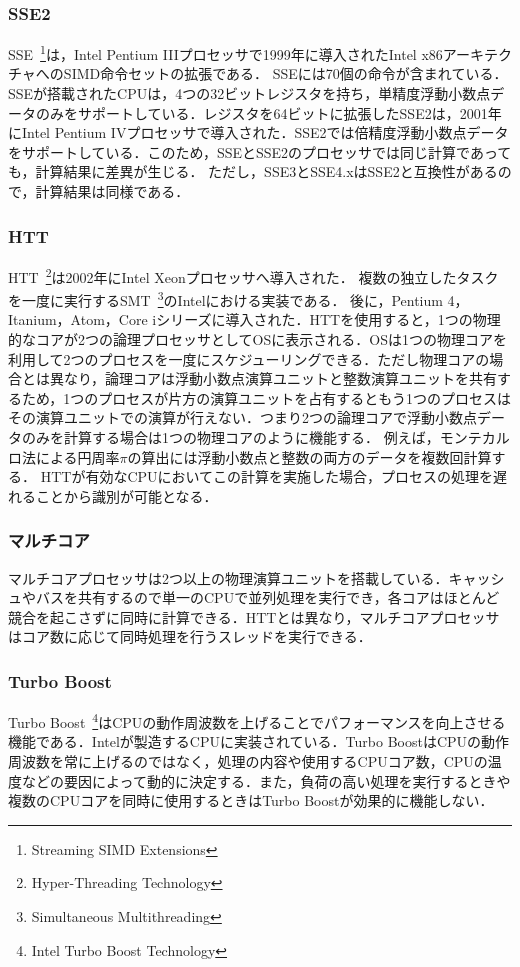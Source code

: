 \subsubsection{SSE2}
SSE~\footnote{Streaming SIMD Extensions}は，Intel Pentium IIIプロセッサで1999年に導入されたIntel x86アーキテクチャへのSIMD命令セットの拡張である． SSEには70個の命令が含まれている．SSEが搭載されたCPUは，4つの32ビットレジスタを持ち，単精度浮動小数点データのみをサポートしている．レジスタを64ビットに拡張したSSE2は，2001年にIntel Pentium IVプロセッサで導入された．SSE2では倍精度浮動小数点データをサポートしている．このため，SSEとSSE2のプロセッサでは同じ計算であっても，計算結果に差異が生じる．
ただし，SSE3とSSE4.xはSSE2と互換性があるので，計算結果は同様である．
\subsubsection{HTT}
HTT~\footnote{Hyper-Threading Technology}は2002年にIntel Xeonプロセッサへ導入された．
複数の独立したタスクを一度に実行するSMT~\footnote{Simultaneous Multithreading}のIntelにおける実装である．
後に，Pentium 4，Itanium，Atom，Core iシリーズに導入された．HTTを使用すると，1つの物理的なコアが2つの論理プロセッサとしてOSに表示される．OSは1つの物理コアを利用して2つのプロセスを一度にスケジューリングできる．ただし物理コアの場合とは異なり，論理コアは浮動小数点演算ユニットと整数演算ユニットを共有するため，1つのプロセスが片方の演算ユニットを占有するともう1つのプロセスはその演算ユニットでの演算が行えない．つまり2つの論理コアで浮動小数点データのみを計算する場合は1つの物理コアのように機能する．
例えば，モンテカルロ法による円周率$\pi$の算出には浮動小数点と整数の両方のデータを複数回計算する．
HTTが有効なCPUにおいてこの計算を実施した場合，プロセスの処理を遅れることから識別が可能となる．
\subsubsection{マルチコア}
マルチコアプロセッサは2つ以上の物理演算ユニットを搭載している．キャッシュやバスを共有するので単一のCPUで並列処理を実行でき，各コアはほとんど競合を起こさずに同時に計算できる．HTTとは異なり，マルチコアプロセッサはコア数に応じて同時処理を行うスレッドを実行できる．
\subsubsection{Turbo Boost}
Turbo Boost~\footnote{Intel Turbo Boost Technology}はCPUの動作周波数を上げることでパフォーマンスを向上させる機能である．Intelが製造するCPUに実装されている．Turbo BoostはCPUの動作周波数を常に上げるのではなく，処理の内容や使用するCPUコア数，CPUの温度などの要因によって動的に決定する．また，負荷の高い処理を実行するときや複数のCPUコアを同時に使用するときはTurbo Boostが効果的に機能しない．

